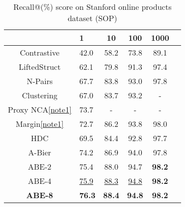 \documentclass[runningheads]{llncs}
\begin{document}
\setlength{\tabcolsep}{4pt}
\begin{table}
\begin{center}
\caption{Recall@(\%) score on Stanford online products dataset (SOP)}
\vspace{-1mm}
\label{table:sopcomptable}
\scriptsize
\begin{tabular}{Sl cccc}
\hline
 & 1 & 10 & 100 & 1000 \\
\hline
Contrastive \cite{oh2016deep} & 42.0 & 58.2 & 73.8 & 89.1 \\
LiftedStruct \cite{oh2016deep} & 62.1 & 79.8 & 91.3 & 97.4 \\
N-Pairs \cite{sohn2016improved} & 67.7 & 83.8 & 93.0 & 97.8 \\
Clustering \cite{song2017deep} & 67.0 & 83.7 & 93.2 & - \\
Proxy NCA\ref{note1} \cite{movshovitz2017no} & 73.7 & - & - & - \\
Margin\ref{note1} \cite{wu2017sampling} & 72.7 & 86.2 & 93.8 & 98.0 \\
HDC \cite{yuan2016hard} & 69.5 & 84.4 & 92.8 & 97.7 \\
A-Bier \cite{opitz2018deep} & 74.2 & 86.9 & 94.0 & 97.8 \\
\hline
ABE-2 & 75.4 & 88.0 & 94.7 & \textbf{98.2} \\
ABE-4 & \underline{75.9} & \underline{88.3} & \underline{94.8} & \textbf{98.2} \\
\textbf{ABE-8} & \textbf{76.3} & \textbf{88.4} & \textbf{94.8} & \textbf{98.2} \\

\hline
\end{tabular}
\end{center}
\end{table}
\setlength{\tabcolsep}{1.4pt}
\end{document}
